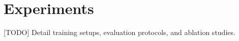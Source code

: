 \section{Experiments}
\label{sec:experiments}

[TODO] Detail training setups, evaluation protocols, and ablation studies.
